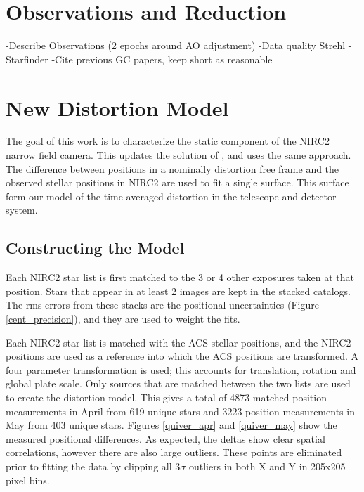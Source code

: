 \section{Observations and Reduction}
-Describe Observations (2 epochs around AO adjustment)
-Data quality Strehl
-Starfinder
-Cite previous GC papers, keep short as reasonable

\section{New Distortion Model}
The goal of this work is to characterize the static component of the NIRC2 narrow field camera.  This updates the solution of \cite{Yelda_2010}, and uses the same approach.  The difference between positions in a nominally distortion free frame and the observed stellar positions in NIRC2 are used to fit a single surface.  This surface form our model of the time-averaged distortion  in the telescope and detector system.

\subsection{Constructing the Model}
Each NIRC2 star list is first matched to the 3 or 4 other exposures taken at that position.  Stars that appear in at least 2 images are kept in the stacked catalogs.  The rms errors from these stacks are the positional uncertainties (Figure \ref{cent_precision}), and they are used to weight the fits.

Each NIRC2 star list is matched with the ACS stellar positions, and the NIRC2 positions are used as a reference into which the ACS positions are transformed.  A four parameter transformation is used; this accounts for translation, rotation and global plate scale.  Only sources that are matched between the two lists are used to create the distortion model.    This gives a total of 4873 matched position measurements in April from 619 unique stars  and 3223 position measurements in May from 403 unique stars.  Figures \ref{quiver_apr} and \ref{quiver_may} show the measured positional differences.  As expected, the deltas show clear spatial correlations, however there are also large outliers.  These points are eliminated prior to fitting the data by clipping all 3$\sigma$ outliers in both X and Y in 205x205 pixel bins.  

